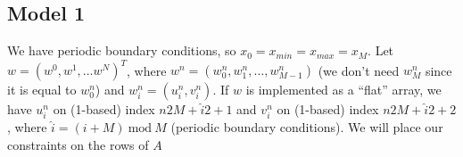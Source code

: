 \documentclass{article}
\renewcommand{\mod}{~\mathrm{mod}~}
\renewcommand{\(}{\left(}
\renewcommand{\)}{\right)}
\newcommand{\uin}{u_i^n}
\newcommand{\vin}{v_i^n}
\begin{document}
\subsection*{Model 1}
We have periodic boundary conditions, so $x_0 = x_{min} = x_{max} = x_M$. Let $w=(w^0, w^1, \dots w^N)^T$, where $w^n=(w_0^n,w_1^n,\dots,w_{M-1}^n)$ (we don't need $w_M^n$ since it is equal to $w_0^n$) and $w_i^n = (\uin,\vin)$. If $w$ is implemented as a ``flat'' array, we have $\uin$ on (1-based) index $n2M+\hat i 2+1$ and $\vin$ on (1-based) index $n2M+\hat i 2+2$, where $\hat i = (i+M)\mod M$ (periodic boundary conditions).%
We will place our constraints on the rows of $A$
\end{document}
